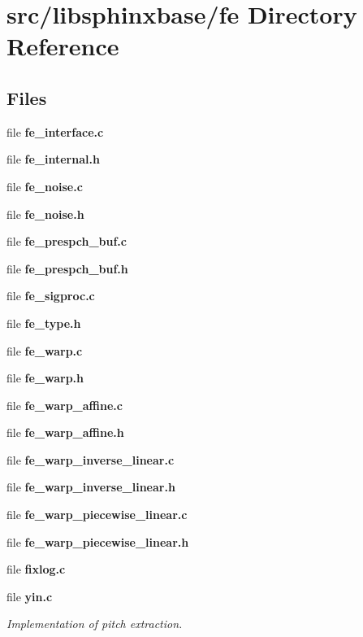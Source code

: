 \section{src/libsphinxbase/fe Directory Reference}
\label{dir_b1d999ee57d4a6d8d8bcab6209918fc2}
\subsection*{Files}
\begin{DoxyCompactItemize}
\item 
file {\bfseries fe\+\_\+interface.\+c}
\item 
file {\bfseries fe\+\_\+internal.\+h}
\item 
file {\bfseries fe\+\_\+noise.\+c}
\item 
file {\bfseries fe\+\_\+noise.\+h}
\item 
file {\bfseries fe\+\_\+prespch\+\_\+buf.\+c}
\item 
file {\bfseries fe\+\_\+prespch\+\_\+buf.\+h}
\item 
file {\bfseries fe\+\_\+sigproc.\+c}
\item 
file {\bfseries fe\+\_\+type.\+h}
\item 
file {\bfseries fe\+\_\+warp.\+c}
\item 
file {\bfseries fe\+\_\+warp.\+h}
\item 
file {\bfseries fe\+\_\+warp\+\_\+affine.\+c}
\item 
file {\bfseries fe\+\_\+warp\+\_\+affine.\+h}
\item 
file {\bfseries fe\+\_\+warp\+\_\+inverse\+\_\+linear.\+c}
\item 
file {\bfseries fe\+\_\+warp\+\_\+inverse\+\_\+linear.\+h}
\item 
file {\bfseries fe\+\_\+warp\+\_\+piecewise\+\_\+linear.\+c}
\item 
file {\bfseries fe\+\_\+warp\+\_\+piecewise\+\_\+linear.\+h}
\item 
file {\bfseries fixlog.\+c}
\item 
file {\bf yin.\+c}
\begin{DoxyCompactList}\small\item\em Implementation of pitch extraction. \end{DoxyCompactList}\end{DoxyCompactItemize}
